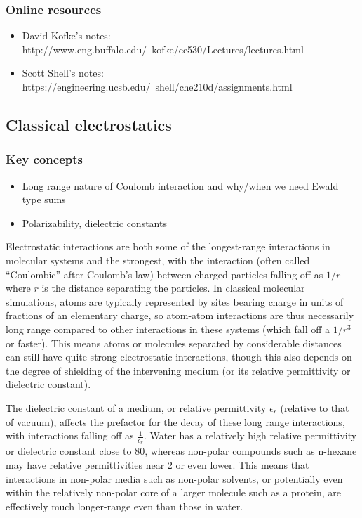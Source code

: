 \documentclass[9pt,bestpractices]{livecoms}
\begin{document}
\subsubsection{Online resources}
\begin{itemize}
\item David Kofke's notes: http://www.eng.buffalo.edu/~kofke/ce530/Lectures/lectures.html
\item Scott Shell's notes: https://engineering.ucsb.edu/~shell/che210d/assignments.html
\end{itemize}

\subsection{Classical electrostatics}
\subsubsection{Key concepts}
\begin{itemize}
\item Long range nature of Coulomb interaction and why/when we need Ewald type sums
\item Polarizability, dielectric constants
\end{itemize}

Electrostatic interactions are both some of the longest-range interactions in molecular systems and the strongest, with the interaction (often called ``Coulombic'' after Coulomb's law) between charged particles falling off as $1/r$ where $r$ is the distance separating the particles.
In classical molecular simulations, atoms are typically represented by sites bearing charge in units of fractions of an elementary charge, so atom-atom interactions are thus necessarily long range compared to other interactions in these systems (which fall off a $1/r^3$ or faster). 
This means atoms or molecules separated by considerable distances can still have quite strong electrostatic interactions, though this also depends on the degree of shielding of the intervening medium (or its relative permittivity or dielectric constant).

The dielectric constant of a medium, or relative permittivity $\epsilon_r$ (relative to that of vacuum), affects the prefactor for the decay of these long range interactions, with interactions falling off as $\frac{1}{\epsilon_r}$.
Water has a relatively high relative permittivity or dielectric constant close to 80, whereas non-polar compounds such as n-hexane may have relative permittivities near 2 or even lower. 
This means that interactions in non-polar media such as non-polar solvents, or potentially even within the relatively non-polar core of a larger molecule such as a protein, are effectively much longer-range even than those in water. 
\end{document}
